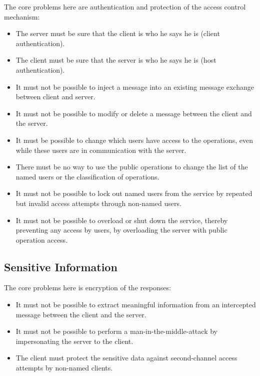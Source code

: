 \documentclass[a4paper]{article}
\begin{document}
The core problems here are authentication and protection of the access control mechanism:

\begin{itemize}

    \item The server must be sure that the client is who he says he is (client authentication).

    \item The client must be sure that the server is who he says he is (host authentication).

    \item It must not be possible to inject a message into an existing message exchange between client and server.

    \item It must not be possible to modify or delete a message between the client and the server.

    \item It must be possible to change which users have access to the operations, even while these users are in communication with the server.

    \item There must be no way to use the public operations to change the list of the named users or the classification of operations.

    \item It must not be possible to lock out named users from the service by repeated but invalid access attempts through non-named users.

    \item It must not be possible to overload or shut down the service, thereby preventing any access by users, by overloading the server with public operation access.

\end{itemize}

\subsection{Sensitive Information}

The core problems here is encryption of the responses:

\begin{itemize}

    \item It must not be possible to extract meaningful information from an intercepted message between the client and the server.

    \item It must not be possible to perform a man-in-the-middle-attack by impersonating the server to the client.

    \item The client must protect the sensitive data against second-channel access attempts by non-named clients.

\end{itemize}
\end{document}
